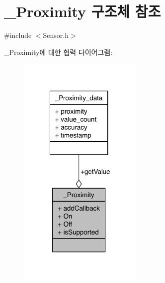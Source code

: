 \hypertarget{struct___proximity}{\section{\-\_\-\-Proximity 구조체 참조}
\label{struct___proximity}
}


{\ttfamily \#include $<$Sensor.\-h$>$}



\-\_\-\-Proximity에 대한 협력 다이어그램\-:
\nopagebreak
\begin{figure}[H]
\begin{center}
\leavevmode
\includegraphics[width=170pt]{d0/d5d/struct___proximity__coll__graph}
\end{center}
\end{figure}
